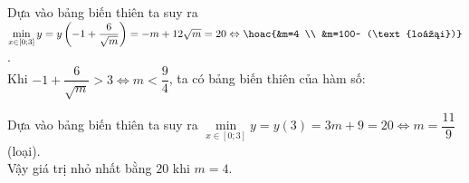 \begin{ex}
{\begin{itemchoice}
\begin{center}
			\end{center}
			Dựa vào bảng biến thiên ta suy  ra \\
			$\min\limits_{x \in[0; 3]} y=y\left(-1+\dfrac{6}{\sqrt{m}}\right)=-m+12 \sqrt{m}=20 \Leftrightarrow\hoac{&m=4  \\ &m=100~ (\text{loại})}$.\\
			Khi $-1+\dfrac{6}{\sqrt{m}}>3 \Leftrightarrow m<\dfrac{9}{4}$, ta có bảng biến thiên của hàm số: 
			\begin{center}
			\end{center}
			 Dựa vào bảng biến thiên ta suy ra $\min\limits_{x \in[0; 3]} y=y(3)=3 m+9=20 \Leftrightarrow m=\dfrac{11}{9}$ (loại).\\
			Vậy giá trị nhỏ nhất bằng  $20$ {khi} $m=4$.
		\end{itemchoice}
	 }
\end{ex}

